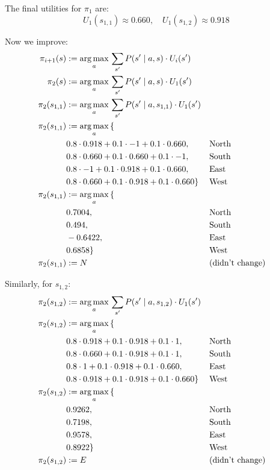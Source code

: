 The final utilities for $\pi_1$ are:
\begin{equation*}
    U_1(s_{1,1}) \approx 0.660, \quad U_1(s_{1,2}) \approx 0.918
\end{equation*}

Now we improve:
\begin{align*}
\pi_{i+1}(s) &:= \mathop{\mathrm{arg\,max}}_{a}\, \sum_{s'} P(s' \mid a,s) \cdot U_i(s') \\
\pi_{2}(s) &:= \mathop{\mathrm{arg\,max}}_{a}\, \sum_{s'} P(s' \mid a,s) \cdot U_1(s') \\
\pi_{2}(s_{1,1}) &:= \mathop{\mathrm{arg\,max}}_{a}\, \sum_{s'} P(s' \mid a,s_{1,1}) \cdot U_1(s') \\
\pi_{2}(s_{1,1}) &:= \mathop{\mathrm{arg\,max}}_{a}\, \{ \\
&0.8 \cdot 0.918 + 0.1 \cdot -1 + 0.1 \cdot 0.660 , && \text{North} \\
&0.8 \cdot 0.660 + 0.1 \cdot 0.660 + 0.1 \cdot -1 ,  && \text{South} \\
&0.8 \cdot -1 + 0.1 \cdot 0.918 + 0.1 \cdot 0.660 ,  && \text{East} \\
&0.8 \cdot 0.660 + 0.1 \cdot 0.918 + 0.1 \cdot 0.660 \} && \text{West} \\
\pi_{2}(s_{1,1}) &:= \mathop{\mathrm{arg\,max}}_{a}\, \{ \\
&0.7004 , && \text{North} \\
&0.494 ,  && \text{South} \\
&-0.6422 ,  && \text{East} \\
&0.6858 \} && \text{West} \\
\pi_{2}(s_{1,1}) &:= N && (\text{didn't change})
\end{align*}

Similarly, for $s_{1,2}$:
\begin{align*}
\pi_{2}(s_{1,2}) &:= \mathop{\mathrm{arg\,max}}_{a}\, \sum_{s'} P(s' \mid a,s_{1,2}) \cdot U_1(s') \\
\pi_{2}(s_{1,2}) &:= \mathop{\mathrm{arg\,max}}_{a}\, \{ \\
&0.8 \cdot 0.918 + 0.1 \cdot 0.918 + 0.1 \cdot 1 , && \text{North} \\
&0.8 \cdot 0.660 + 0.1 \cdot 0.918 + 0.1 \cdot 1 ,  && \text{South} \\
&0.8 \cdot 1 + 0.1 \cdot 0.918 + 0.1 \cdot 0.660 ,  && \text{East} \\
&0.8 \cdot 0.918 + 0.1 \cdot 0.918 + 0.1 \cdot 0.660 \} && \text{West} \\
\pi_{2}(s_{1,2}) &:= \mathop{\mathrm{arg\,max}}_{a}\, \{ \\
&0.9262 , && \text{North} \\
&0.7198 ,  && \text{South} \\
&0.9578 ,  && \text{East} \\
&0.8922 \} && \text{West} \\
\pi_{2}(s_{1,2}) &:= E && (\text{didn't change})
\end{align*}


